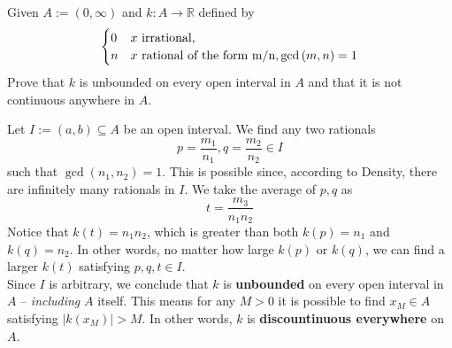 \documentclass[boxes, qed]{homework}
\begin{document}
\newenvironment{amatrix}[1]{%
  \left[\begin{array}{@{}*{#1}{c}|c@{}}
}{%
  \end{array}\right]
}

\newenvironment{augmatrix}[1]{%
  \left[\begin{array}{#1}
}{%
  \end{array}\right]
}
\begin{problem}Given $A:=(0,\infty)$ and $k:A\to \mathbb{R}$
  defined by
  \[\begin{cases} 
    0 & x \text{ irrational},\\
    n & x \text{ rational of the form } $m/n$, \gcd{(m,n)}=1
  \end{cases}\]
  Prove that $k$ is unbounded on every open interval in $A$
  and that it is not continuous anywhere in $A$.
\end{problem}
\begin{solution}Let $I:=(a,b)\subseteq{A}$ be an open interval. We find any two rationals 
  $$p=\frac{m_1}{n_1}, q=\frac{m_2}{n_2} \in I$$ 
  such that $\gcd{(n_1,n_2)}=1$. This is possible since, according to Density,
  there are infinitely many rationals in $I$. We take the average of $p,q$ as
  $$t=\frac{m_3}{n_1n_2}$$
  Notice that $k(t)=n_1n_2$, which is greater than both $k(p)=n_1$ and $k(q)=n_2$.
  In other words, no matter how large $k(p)$ or $k(q)$, 
  we can find a larger $k(t)$ satisfying $p,q,t\in{I}$.\\
  
  Since $I$ is arbitrary, we conclude that $k$ is \textbf{unbounded} 
  on every open interval in $A$ – \textit{including} $A$ itself.
  This means for any $M>0$ it is possible to find $x_M\in{A}$
  satisfying $|k(x_M)|>M$. In other words, $k$ is \textbf{discountinuous
  everywhere} on $A$.
\end{solution}
\end{document}
